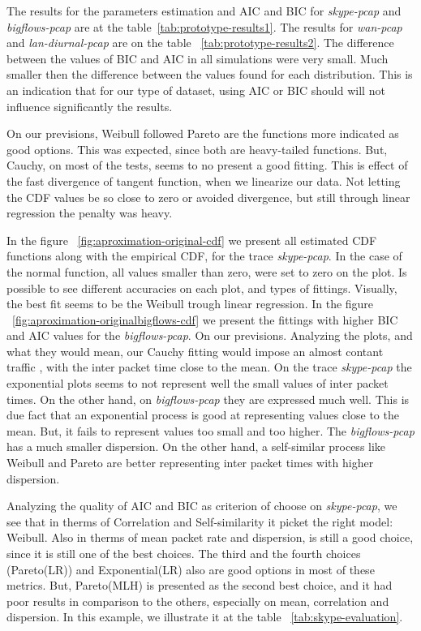 The results for the parameters estimation and AIC and BIC for \textit{skype-pcap} and \textit{bigflows-pcap} are at the table~\ref{tab:prototype-results1}.  The results for \textit{wan-pcap} and \textit{lan-diurnal-pcap} are on the table ~\ref{tab:prototype-results2}. The difference between the values of BIC and AIC in all simulations were very small. Much smaller then the difference between the values found for each distribution. This is an indication that for our type of dataset, using AIC or BIC should will not influence significantly the results. 

On our previsions, Weibull followed Pareto are the functions more indicated as good options. This was expected, since both are heavy-tailed functions. But, Cauchy, on most of the tests, seems to no present a good fitting. This is effect of the fast divergence of tangent function, when we linearize our data. Not letting the CDF values be so close to zero or avoided divergence, but still through linear regression the penalty was heavy. 


In the figure ~\ref{fig:aproximation-original-cdf} we present all estimated CDF functions along with the empirical CDF, for the trace \textit{skype-pcap}. In the case of the normal function, all values smaller than zero, were set to zero on the plot. Is possible to see different accuracies on each plot, and types of fittings. Visually, the best fit seems to be the Weibull trough linear regression. In the figure ~\ref{fig:aproximation-originalbigflows-cdf} we present the fittings with higher BIC and AIC values for the \textit{bigflows-pcap}. On our previsions. Analyzing the plots, and what they would mean, our Cauchy fitting would impose an almost contant traffic , with the inter packet time close to the mean. On the trace \textit{skype-pcap} the exponential plots seems to not represent well the small values of inter packet times. On the other hand, on \textit{bigflows-pcap} they are expressed much well. This is due fact that an exponential process is good at representing values close to the mean. But, it fails to represent values too small and too higher. The \textit{bigflows-pcap}  has a much smaller dispersion. On the other hand, a self-similar process like Weibull and Pareto are better representing inter packet times with higher dispersion. 

Analyzing the quality of AIC and BIC as criterion of choose on \textit{skype-pcap}, we see that in therms of Correlation and Self-similarity it picket the right model: Weibull. Also in therms of mean packet rate and dispersion, is still a good choice, since it is still one of the best choices. The third and the fourth choices (Pareto(LR)) and Exponential(LR) also are good options in most of these metrics. But, Pareto(MLH) is presented as the second best choice, and it had poor results in comparison to the others, especially on mean, correlation and dispersion. In this example, we illustrate it at the table ~\ref{tab:skype-evaluation}.

